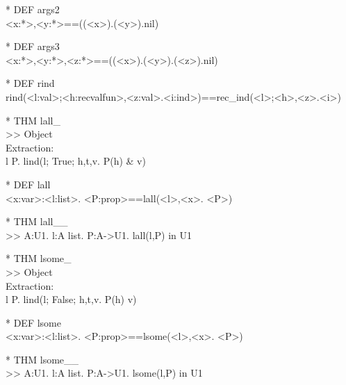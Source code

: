\begin{prl*}
\>* DEF args2\\
\>  <x:*>,<y:*>==((<x>).(<y>).nil)
\end{prl*}

\begin{prl*}
\>* DEF args3\\
\>  <x:*>,<y:*>,<z:*>==((<x>).(<y>).(<z>).nil)
\end{prl*}

\begin{prl*}
\>* DEF rind\\
\>  rind(<l:val>;<h:recvalfun>,<z:val>.<i:ind>)==rec\_ind(<l>;<h>,<z>.<i>)
\end{prl*}

\begin{prl*}
\>* THM lall\_\\
\>  >> Object\\
\>  Extraction:\\
\>  \mlambda{} l P. lind(l; True; h,t,v. P(h) \& v)
\end{prl*}

\begin{prl*}
\>* DEF lall\\
\>  \mforall{}<x:var>:<l:list>. <P:prop>==lall(<l>,\mlambda{}<x>. <P>)
\end{prl*}

\begin{prl*}
\>* THM lall\_\_\\
\>  >> \mforall{}A:U1. \mforall{}l:A list. \mforall{}P:A->U1. lall(l,P) in U1
\end{prl*}

\begin{prl*}
\>* THM lsome\_\\
\>  >> Object\\
\>  Extraction:\\
\>  \mlambda{} l P. lind(l; False; h,t,v. P(h) \mvee{} v)
\end{prl*}

\begin{prl*}
\>* DEF lsome\\
\>  \mexists{}<x:var>:<l:list>. <P:prop>==lsome(<l>,\mlambda{}<x>. <P>)
\end{prl*}

\begin{prl*}
\>* THM lsome\_\_\\
\>  >> \mforall{}A:U1. \mforall{}l:A list. \mforall{}P:A->U1. lsome(l,P) in U1
\end{prl*}

